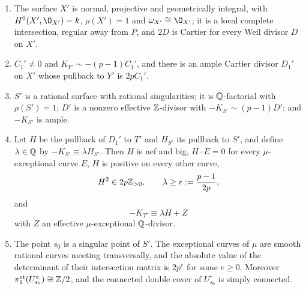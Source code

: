 \begin{lemma}\label{lem:rank-one-setup}
\begin{enumerate}
\item The surface $X'$ is normal, projective and geometrically integral, with $H^0(X',\O_{X'}) = k$, $\rho(X') = 1$ and $\omega_{X'}\cong\O_{X'}$; it is a local complete intersection, regular away from $P$, and $2D$ is Cartier for every Weil divisor $D$ on $X'$.
\item $C_1'\neq 0$ and $K_{Y'}\sim-(p-1)C_1'$, and there is an ample Cartier divisor $D_1'$ on $X'$ whose pullback to $Y'$ is $2pC_1'$.
\item $S'$ is a rational surface with rational singularities; it is $\mathbb{Q}$-factorial with $\rho(S') = 1$; $D'$ is a nonzero effective $\mathbb{Z}$-divisor with $-K_{S'}\sim(p-1)D'$; and $-K_{S'}$ is ample.
\item Let $H$ be the pullback of $D_1'$ to $T'$ and $H_{S'}$ its pullback to $S'$, and define $\lambda\in\mathbb{Q}$ by $-K_{S'}\equiv\lambda H_{S'}$.
  Then $H$ is nef and big, $H\cdot E = 0$ for every $\mu$-exceptional curve $E$, $H$ is positive on every other curve,
  \[
    H^2\in 2p\mathbb{Z}_{>0},\qquad\lambda\geq r := \frac{p-1}{2p},
  \]
  and
  \begin{equation}\label{eq:KT}
    -K_{T'}\equiv\lambda H+Z
  \end{equation}
  with $Z$ an effective $\mu$-exceptional $\mathbb{Q}$-divisor.
\item The point $s_0$ is a singular point of $S'$.
  The exceptional curves of $\mu$ are smooth rational curves meeting transversally, and the absolute value of the determinant of their intersection matrix is $2p^e$ for some $e\geq 0$.
  Moreover $\pi_1^{\rm et}(U_{s_0}^\circ)\cong\mathbb{Z}/2$, and the connected double cover of $U_{s_0}^\circ$ is simply connected.
\end{enumerate}
\end{lemma}

